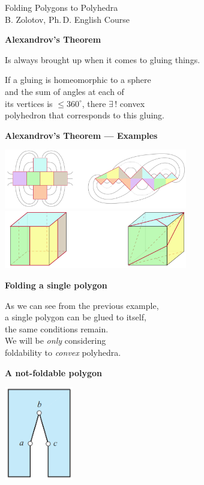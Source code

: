 \documentclass[11pt,a4paper]{extarticle}
\begin{document}
 \pagestyle{empty}

\begin{center} {\Large Folding Polygons to Polyhedra} \bigskip \\
	{\large B. Zolotov, Ph.\,D. English Course} \end{center}

{\large \bf Alexandrov's Theorem}

Is always brought up when it comes to gluing things. \medskip

If a gluing is homeomorphic to a sphere \\
and the sum of angles at each of \\
its vertices is $\le 360^\circ$\!, there $\exists\,!$ convex \\
polyhedron that corresponds to this gluing.

{\large \bf Alexandrov's Theorem — Examples}

\begin{center}
	\includegraphics[width=0.6\textwidth]{minilec/alex-bef} \medskip \\
	\includegraphics[width=0.6\textwidth]{minilec/alex-zaft}
\end{center}

{\large \bf Folding a single polygon}

As we can see from the previous example, \\
a single polygon can be glued to itself, \\
the same conditions remain. \medskip \\
We will be {\it only} considering \\
foldability to {\it convex} polyhedra.

{\large \bf A not-foldable polygon}

\begin{center}
	\includegraphics[width=3cm]{minilec/notf}
\end{center} \vspace{-5mm}
\end{document}

